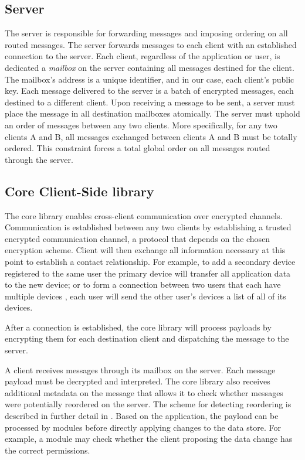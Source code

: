 \subsection{Server}
The server is responsible for forwarding messages and imposing ordering on all routed messages. The server forwards messages to each client with an established connection to the server. Each client, regardless of the application or user, is dedicated a \textit{mailbox} on the server containing all messages destined for the client. The mailbox's address is a unique identifier, and in our case, each client's public key. Each message delivered to the server is a batch of encrypted messages, each destined to a different client. Upon receiving a message to be sent, a server must place the message in all destination mailboxes atomically. The server must uphold an order of messages between any two clients. More specifically, for any two clients A and B, all messages exchanged between clients A and B must be totally ordered. This constraint forces a total global order on all messages routed through the server. 


\subsection{Core Client-Side library}
The core library enables cross-client communication over encrypted channels. Communication is established between any two clients by establishing a trusted encrypted communication channel, a protocol that depends on the chosen encryption scheme. Client will then exchange all information necessary at this point to establish a contact relationship. For example, to add a secondary device registered to the same user the primary device will transfer all application data to the new device; or to form a connection between two users that each have multiple devices , each user will send the other user's devices a list of all of its devices. 

After a connection is established, the core library will process payloads by encrypting them for each destination client and dispatching the message to the server. 

A client receives messages through its mailbox on the server. Each message payload must be decrypted and interpreted. The core library also receives additional metadata on the message that allows it to check whether messages were potentially reordered on the server. The scheme for detecting reordering is described in further detail in . Based on the application, the payload can be processed by modules before directly applying changes to the data store. For example, a module may check whether the client proposing the data change has the correct permissions. 

